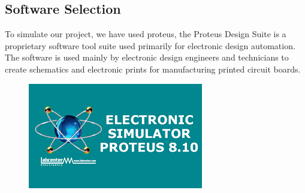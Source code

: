 \subsection{Software Selection}
To simulate our project, we have used proteus, the Proteus Design Suite is a proprietary software tool suite used primarily for electronic design automation. The software is used mainly by electronic design engineers and technicians to create schematics and electronic prints for manufacturing printed circuit boards. \begin{figure}[H]  %
\begin{center}
\includegraphics[scale= 1.5]{Chapter3/proteus}
\end{center}
\end{figure}

